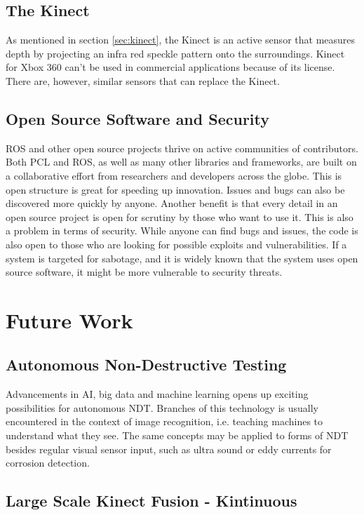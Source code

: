 \subsection{The Kinect}

As mentioned in section \ref{sec:kinect}, the Kinect is an active sensor that measures depth by projecting an infra red speckle pattern onto the surroundings.  Kinect for Xbox 360 can't be used in commercial applications because of its license. There are, however, similar sensors that can replace the Kinect.

\subsection{Open Source Software and Security}

\ac{ROS} and other open source projects thrive on active communities of contributors. Both \ac{PCL} and \ac{ROS}, as well as many other libraries and frameworks, are built on a collaborative effort from researchers and developers across the globe. This is open structure is great for speeding up innovation. Issues and bugs can also be discovered more quickly by anyone. Another benefit is that every detail in an open source project is open for scrutiny by those who want to use it. This is also a problem in terms of security. While anyone can find bugs and issues, the code is also open to those who are looking for possible exploits and vulnerabilities. If a system is targeted for sabotage, and it is widely known that the system uses open source software, it might be more vulnerable to security threats.

\section{Future Work}

\subsection{Autonomous Non-Destructive Testing}

Advancements in \ac{AI}, big data and machine learning opens up exciting possibilities for autonomous \ac{NDT}. Branches of this technology is usually encountered in the context of image recognition, i.e. teaching machines to understand what they see. The same concepts may be applied to forms of \ac{NDT} besides regular visual sensor input, such as ultra sound or eddy currents for corrosion detection.  

\subsection{Large Scale Kinect Fusion - Kintinuous}

